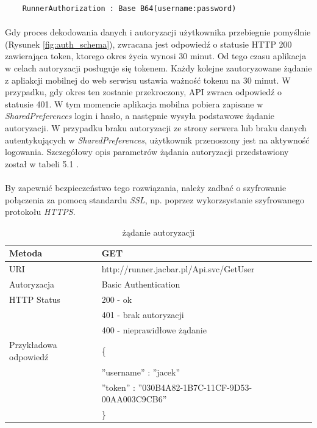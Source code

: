
\begin{lstlisting}
	RunnerAuthorization : Base B64(username:password)
\end{lstlisting}

\paragraph{} %
\label{par:}
Gdy proces dekodowania danych i autoryzacji użytkownika przebiegnie pomyślnie (Rysunek \ref{fig:auth_schema}), zwracana jest odpowiedź o statusie HTTP 200 zawierająca token, ktorego okres życia wynosi 30 minut. Od tego czasu aplikacja w celach autoryzacji posługuje się tokenem. Każdy kolejne zautoryzowane żądanie z apliakcji mobilnej do web serwisu ustawia ważność tokenu na 30 minut. W przypadku, gdy okres ten zostanie przekroczony, API zwraca odpowiedź o statusie 401. W tym momencie aplikacja mobilna pobiera zapisane w \textit{SharedPreferences} login i hasło, a następnie wysyła podstawowe żądanie autoryzacji. W przypadku braku autoryzacji ze strony serwera lub braku danych autentykujących w \textit{SharedPreferences}, użytkownik przenoszony jest na aktywność logowania. Szczegółowy opis parametrów żądania autoryzacji przedstawiony został w tabeli 5.1 .

\paragraph{} %
\label{par:}
By zapewnić bezpieczeństwo tego rozwiązania, należy zadbać o szyfrowanie połączenia za pomocą standardu \textit{SSL}, np. poprzez wykorzsystanie szyfrowanego protokołu \textit{HTTPS}.
\begin{table}
 \label{tab:aut}
  \caption{żądanie autoryzacji}
  \begin{center}
  \begin{tabular}{| l | l |}
  	\hline
  	Metoda & GET \\ \hline
  	URI & http://runner.jacbar.pl/Api.svc/GetUser \\ \hline
  	Autoryzacja & Basic Authentication \\ \hline
  	HTTP Status & 200 - ok \\
                & 401 - brak autoryzacji \\
                & 400 - nieprawidłowe żądanie \\ \hline
    Przykładowa odpowiedź & \{ \\
                          & \quad ''username'' : ''jacek'' \\
                          & \quad ''token'' : ''030B4A82-1B7C-11CF-9D53-00AA003C9CB6'' \\
                          & \} \\ \hline
  \end{tabular}
  \end{center}
\end{table}

